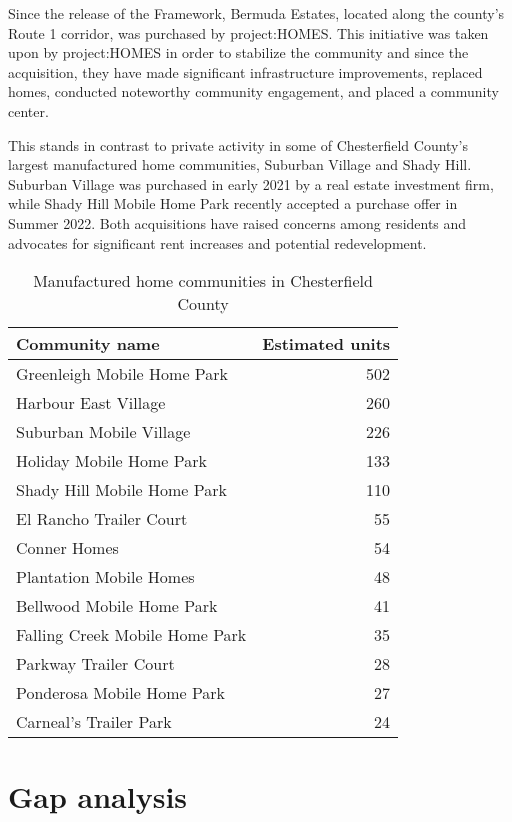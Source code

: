 \documentclass[
  letterpaper,
  DIV=11,
  numbers=noendperiod]{scrreprt}
\begin{document}
Since the release of the Framework, Bermuda Estates, located along the
county's Route 1 corridor, was purchased by project:HOMES. This
initiative was taken upon by project:HOMES in order to stabilize the
community and since the acquisition, they have made significant
infrastructure improvements, replaced homes, conducted noteworthy
community engagement, and placed a community center.

This stands in contrast to private activity in some of Chesterfield
County's largest manufactured home communities, Suburban Village and
Shady Hill. Suburban Village was purchased in early 2021 by a real
estate investment firm, while Shady Hill Mobile Home Park recently
accepted a purchase offer in Summer 2022. Both acquisitions have raised
concerns among residents and advocates for significant rent increases
and potential redevelopment.

\hypertarget{tbl-mhccv}{}
\begin{table}
\caption{\label{tbl-mhccv}Manufactured home communities in Chesterfield County }\tabularnewline

\centering
\begin{tabular}{l|r}
\hline
Community name & Estimated units\\
\hline
Greenleigh Mobile Home Park & 502\\
\hline
Harbour East Village & 260\\
\hline
Suburban Mobile Village & 226\\
\hline
Holiday Mobile Home Park & 133\\
\hline
Shady Hill Mobile Home Park & 110\\
\hline
El Rancho Trailer Court & 55\\
\hline
Conner Homes & 54\\
\hline
Plantation Mobile Homes & 48\\
\hline
Bellwood Mobile Home Park & 41\\
\hline
Falling Creek Mobile Home Park & 35\\
\hline
Parkway Trailer Court & 28\\
\hline
Ponderosa Mobile Home Park & 27\\
\hline
Carneal's Trailer Park & 24\\
\hline
\end{tabular}
\end{table}

\hypertarget{gap-analysis-1}{%
\section{Gap analysis}\label{gap-analysis-1}}
\end{document}
